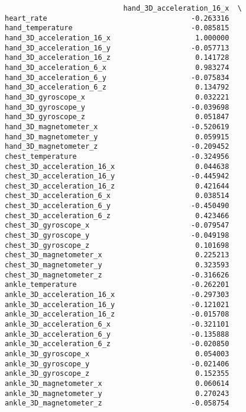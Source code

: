 \documentclass[11pt]{article}
\begin{document}
\begin{verbatim}
                            hand_3D_acceleration_16_x  \
heart_rate                                  -0.263316   
hand_temperature                            -0.085815   
hand_3D_acceleration_16_x                    1.000000   
hand_3D_acceleration_16_y                   -0.057713   
hand_3D_acceleration_16_z                    0.141728   
hand_3D_acceleration_6_x                     0.983274   
hand_3D_acceleration_6_y                    -0.075834   
hand_3D_acceleration_6_z                     0.134792   
hand_3D_gyroscope_x                          0.032221   
hand_3D_gyroscope_y                         -0.039698   
hand_3D_gyroscope_z                          0.051847   
hand_3D_magnetometer_x                      -0.520619   
hand_3D_magnetometer_y                       0.059915   
hand_3D_magnetometer_z                      -0.209452   
chest_temperature                           -0.324956   
chest_3D_acceleration_16_x                   0.044638   
chest_3D_acceleration_16_y                  -0.445942   
chest_3D_acceleration_16_z                   0.421644   
chest_3D_acceleration_6_x                    0.038514   
chest_3D_acceleration_6_y                   -0.450490   
chest_3D_acceleration_6_z                    0.423466   
chest_3D_gyroscope_x                        -0.079547   
chest_3D_gyroscope_y                        -0.049198   
chest_3D_gyroscope_z                         0.101698   
chest_3D_magnetometer_x                      0.225213   
chest_3D_magnetometer_y                      0.323593   
chest_3D_magnetometer_z                     -0.316626   
ankle_temperature                           -0.262201   
ankle_3D_acceleration_16_x                  -0.297303   
ankle_3D_acceleration_16_y                  -0.121021   
ankle_3D_acceleration_16_z                  -0.015708   
ankle_3D_acceleration_6_x                   -0.321101   
ankle_3D_acceleration_6_y                   -0.135888   
ankle_3D_acceleration_6_z                   -0.020850   
ankle_3D_gyroscope_x                         0.054003   
ankle_3D_gyroscope_y                        -0.021406   
ankle_3D_gyroscope_z                         0.152355   
ankle_3D_magnetometer_x                      0.060614   
ankle_3D_magnetometer_y                      0.270243   
ankle_3D_magnetometer_z                     -0.058754   


\end{verbatim}
\end{document}
